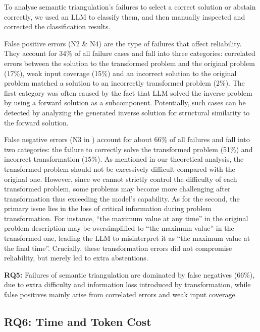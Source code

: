 \documentclass[acmsmall,screen,nonacm]{acmart}
\begin{document}
To analyse semantic triangulation's failures to select a correct solution or abstain correctly, we used an LLM to classify them, and then manually inspected and corrected the classification results.

False positive errors (N2 \& N4) are the type of failures that affect reliability. They account for 34\% of all failure cases and fall into three categories: correlated errors between the solution to the transformed problem and the original problem (17\%), weak input coverage (15\%) and an incorrect solution to the original problem matched a solution to an incorrectly transformed problem (2\%). The first category was often caused by the fact that LLM solved the inverse problem by using a forward solution as a subcomponent. Potentially, such cases can be detected by analyzing the generated inverse solution for structural similarity to the forward solution.

False negative errors (N3 in ) account for about 66\% of all failures and fall into two categories: the failure to correctly solve the transformed problem (51\%) and incorrect transformation (15\%). As mentioned in our theoretical analysis, the transformed problem should not be excessively difficult compared with the original one. However, since we cannot strictly control the difficulty of each transformed problem, some problems may become more challenging after transformation thus exceeding the model's capability. As for the second, the primary issue lies in the loss of critical information during problem transformation. For instance, ``the maximum value at any time'' in the original problem description may be oversimplified to ``the maximum value'' in the transformed one, leading the LLM to misinterpret it as ``the maximum value at the final time''. Crucially, these transformation errors did not compromise reliability, but merely led to extra abstentions.

\begin{tcolorbox}[colback=gray!5, colframe=black!20, arc=2pt, boxrule=0.3mm, breakable, sharp corners, left=2pt, right=2pt, top=2pt, bottom=2pt]
\textbf{RQ5:} Failures of semantic triangulation are dominated by false negatives (66\%), due to extra difficulty and information loss introduced by transformation, while false positives mainly arise from correlated errors and weak input coverage.
\end{tcolorbox}


\subsection{RQ6: Time and Token Cost}
\end{document}
